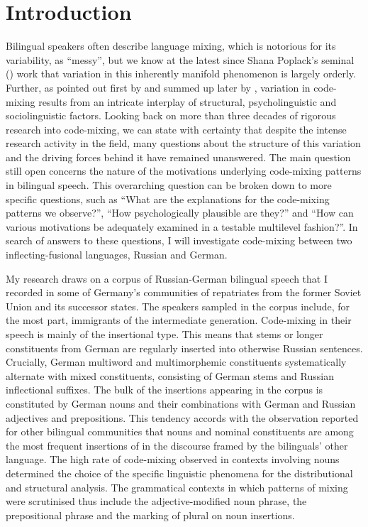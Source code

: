 \chapter*{Introduction} %

Bilingual speakers often describe language mixing, which is notorious for its variability, as “messy”, but we know at the latest since Shana Poplack's seminal (\citeyear{poplack-sometimes-1980}) work that variation in this inherently manifold phenomenon is largely orderly. Further, as pointed out first by \citet{bokamba89} and summed up later by \citet[][487]{muysken-etal96}, variation in code-mixing results from an intricate interplay of structural, psycholinguistic and sociolinguistic factors. Looking back on more than three decades of rigorous research into code-mixing, we can state with certainty that despite the intense research activity in the field, many questions about the structure of this variation and the driving forces behind it have remained unanswered. The main question still open concerns the nature of the motivations underlying code-mixing patterns in bilingual speech. This overarching question can be broken down to more specific questions, such as ``What are the explanations for the code-mixing patterns we observe?'', ``How psychologically plausible are they?'' and ``How can various motivations be adequately examined in a testable multilevel fashion?''. In search of answers to these questions, I will investigate code-mixing between two inflecting-fusional languages, Russian and German.

My research draws on a corpus of Russian-German bilingual speech that I recorded in some of Germany's communities of repatriates from the former Soviet Union and its successor states. The speakers sampled in the corpus include, for the most part, immigrants of the intermediate generation. Code-mixing in their speech is mainly of the insertional type. This means that stems or longer constituents from German are regularly inserted into otherwise Russian sentences. Crucially, German multiword and multimorphemic constituents systematically alternate with mixed constituents, consisting of German stems and Russian inflectional suffixes. The bulk of the insertions appearing in the corpus is constituted by German nouns and their combinations with German and Russian adjectives and prepositions. This tendency accords with the observation reported for other bilingual communities that nouns and nominal constituents are among the most frequent insertions of in the discourse framed by the bilinguals' other language. The high rate of code-mixing observed in  contexts involving nouns determined the choice of the specific linguistic phenomena for the distributional and structural analysis. The grammatical contexts in which patterns of mixing were scrutinised thus include the adjective-modified noun phrase, the prepositional phrase and the marking of plural on noun insertions. 

